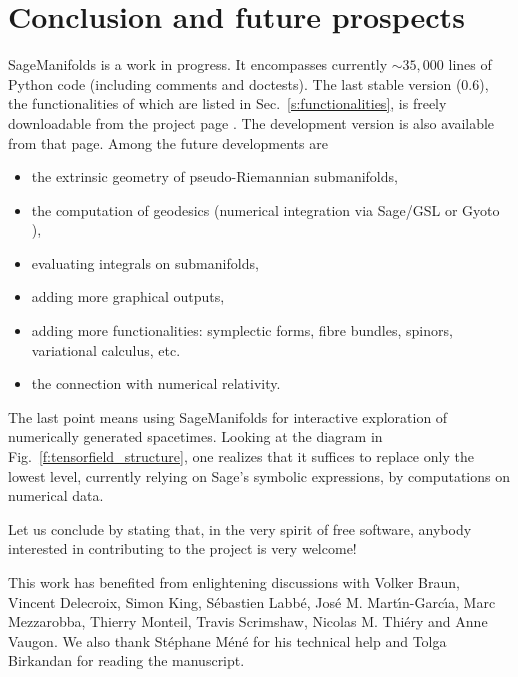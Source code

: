 \documentclass[a4paper]{jpconf}
\newcommand{\soft}[1]{\textsf{#1}}
\newcommand{\Sage}{\soft{Sage}}
\newcommand{\SM}{\soft{SageManifolds}}
\begin{document}

\section{Conclusion and future prospects}

\SM{} is a work in progress. 
It encompasses currently $\sim 35,000$ lines of Python code (including comments and 
doctests). 
The last stable version (0.6), the functionalities of which are 
listed in Sec.~\ref{s:functionalities},
is freely downloadable from the project page
\cite{SM}. The development version is also available 
from that page. Among the future developments are 
\begin{itemize}
\item the extrinsic geometry of pseudo-Riemannian submanifolds,
\item the computation of geodesics (numerical integration via \soft{Sage/GSL} or 
\soft{Gyoto} \cite{Gyoto}),
\item evaluating integrals on submanifolds,
\item adding more graphical outputs,
\item adding more functionalities: symplectic forms, fibre bundles, 
spinors, variational calculus, etc.
\item the connection with numerical relativity.
\end{itemize}
The last point means using \SM{} for interactive exploration 
of numerically generated spacetimes. Looking at
the diagram in Fig.~\ref{f:tensorfield_structure}, one realizes that it 
suffices to replace only the lowest level, currently relying on
\Sage{}'s symbolic expressions, by computations on numerical data. 

Let us conclude by stating that, in the very spirit of free software, 
anybody interested in contributing to the project is very welcome!


\ack
This work has benefited from enlightening discussions with Volker Braun,
Vincent Delecroix, Simon King, S\'ebastien Labb\'e, Jos\'e M. Mart\'\i n-Garc\'\i a, 
Marc Mezzarobba, Thierry Monteil, Travis Scrimshaw,  Nicolas M.  Thi\'ery
and Anne Vaugon. 
We also thank St\'ephane M\'en\'e for his technical help and
Tolga Birkandan for reading the manuscript. 
\end{document}
